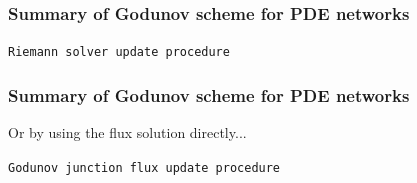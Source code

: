 
\begin{frame}
\frametitle{Summary of Godunov scheme for PDE networks}

\begin{algorithm}[H]
\caption{\texttt{Riemann solver update procedure}}

\end{algorithm}

\end{frame}

\begin{frame}
\frametitle{Summary of Godunov scheme for PDE networks}

Or by using the flux solution directly...

\begin{algorithm}[H]
\caption{\texttt{Godunov junction flux update procedure}}

\end{algorithm}

\end{frame}



